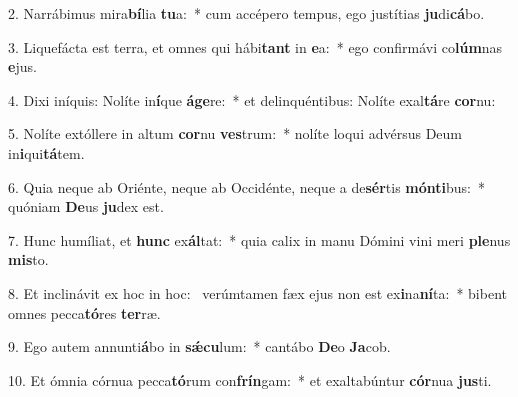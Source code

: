 2. Narrábimus mira\textbf{bí}lia \textbf{tu}a:~*  cum accépero tempus, ego justítias \textbf{ju}di\textbf{cá}bo.\

3. Liquefácta est terra, et omnes qui hábi\textbf{tant} in \textbf{e}a:~*  ego confirmávi co\textbf{lúm}nas \textbf{e}jus.\

4. Dixi iníquis: Nolíte in\textbf{í}que \textbf{á}\textbf{ge}re:~*  et delinquéntibus: Nolíte exal\textbf{tá}re \textbf{cor}nu:\

5. Nolíte extóllere in altum \textbf{cor}nu \textbf{ves}trum:~*  nolíte loqui advérsus Deum in\textbf{i}qui\textbf{tá}tem.\

6. Quia neque ab Oriénte, neque ab Occidénte, neque a de\textbf{sér}tis \textbf{món}\textbf{ti}bus:~*  quóniam \textbf{De}us \textbf{ju}dex est.\

7. Hunc humíliat, et \textbf{hunc} ex\textbf{ál}tat:~*  quia calix in manu Dómini vini meri \textbf{ple}nus \textbf{mis}to.\

8. Et inclinávit ex hoc in hoc: \dag\  verúmtamen fæx ejus non est ex\textbf{i}na\textbf{ní}ta:~*  bibent omnes pecca\textbf{tó}res \textbf{ter}ræ.\

9. Ego autem annunti\textbf{á}bo in \textbf{sǽ}\textbf{cu}lum:~*  cantábo \textbf{De}o \textbf{Ja}cob.\

10. Et ómnia córnua pecca\textbf{tó}rum con\textbf{frín}gam:~*  et exaltabúntur \textbf{cór}nua \textbf{jus}ti.\


